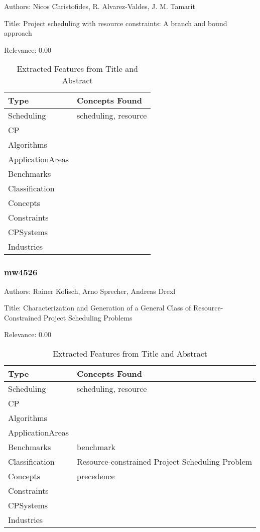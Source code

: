Authors: Nicos Christofides, R. Alvarez-Valdes, J. M. Tamarit

Title: Project scheduling with resource constraints: A branch and bound approach

Relevance:  0.00

{\scriptsize
\begin{longtable}{p{2cm}p{20cm}}
\caption{Extracted Features from Title and Abstract}\\ \toprule
Type & Concepts Found\\ \midrule
\endhead
\bottomrule
\endfoot
Scheduling & scheduling, resource\\ 
CP & \\ 
Algorithms & \\ 
ApplicationAreas & \\ 
Benchmarks & \\ 
Classification & \\ 
Concepts & \\ 
Constraints & \\ 
CPSystems & \\ 
Industries & \\ 
\end{longtable}
}



\subsubsection{mw4526}
\label{mw:mw4526}

Authors: Rainer Kolisch, Arno Sprecher, Andreas Drexl

Title: Characterization and Generation of a General Class of Resource-Constrained Project Scheduling Problems

Relevance:  0.00

{\scriptsize
\begin{longtable}{p{2cm}p{20cm}}
\caption{Extracted Features from Title and Abstract}\\ \toprule
Type & Concepts Found\\ \midrule
\endhead
\bottomrule
\endfoot
Scheduling & scheduling, resource\\ 
CP & \\ 
Algorithms & \\ 
ApplicationAreas & \\ 
Benchmarks & benchmark\\ 
Classification & Resource-constrained Project Scheduling Problem\\ 
Concepts & precedence\\ 
Constraints & \\ 
CPSystems & \\ 
Industries & \\ 
\end{longtable}
}

